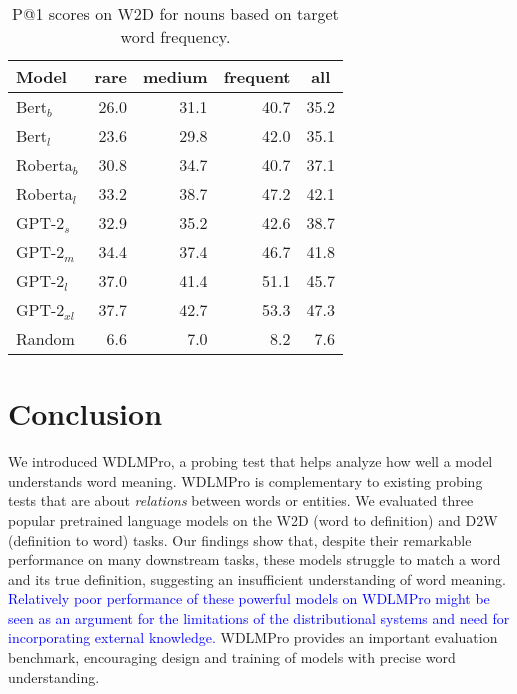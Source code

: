 \documentclass[11pt,a4paper]{article}
\begin{document}
\begin{table}
    \centering
    \begin{tabular}{l|rrrr}
    \hline
         \textbf{Model} & \multicolumn{1}{c}{\textbf{rare}} & \multicolumn{1}{c}{\textbf{medium}} & \multicolumn{1}{c}{\textbf{frequent}} & \multicolumn{1}{c}{\textbf{all}} \\ \hline
     Bert$_{b}$ & 26.0 & 31.1 & 40.7 & 35.2 \\
     Bert$_{l}$ & 23.6 & 29.8 & 42.0 & 35.1 \\
     Roberta$_{b}$ & 30.8 & 34.7 & 40.7 & 37.1 \\
     Roberta$_{l}$ & 33.2 & 38.7 & 47.2 & 42.1 \\ \hline
     GPT-2$_{s}$ & 32.9 & 35.2 & 42.6 & 38.7 \\
     GPT-2$_{m}$ & 34.4 & 37.4 & 46.7 & 41.8 \\
     GPT-2$_{l}$ & 37.0 & 41.4 & 51.1 & 45.7 \\
     GPT-2$_{xl}$ & 37.7 & 42.7 & 53.3 & 47.3 \\ \hline
     Random & 6.6 & 7.0 & 8.2 & 7.6 \\ \hline 
     
    \end{tabular}
    \caption{P@1 scores on W2D for nouns based on target word frequency.}
    \label{tab:freq_results_W2D}
\end{table}



\section{Conclusion}
We introduced
WDLMPro,
a
probing test that helps  analyze  how well a model
understands word meaning. WDLMPro is complementary to existing
probing tests that are about
\emph{relations} between words or entities.
We evaluated three popular pretrained language
models on the W2D (word to definition) and D2W (definition
to word) tasks. Our findings show
that, despite their remarkable performance on many
downstream tasks, these models struggle to match a word and
its true definition, suggesting an insufficient
understanding of word meaning.
\textcolor{blue}{Relatively poor performance of these powerful models on WDLMPro might be seen as an argument for the limitations of the distributional systems and need for incorporating external knowledge.} 
WDLMPro provides an important
evaluation benchmark, encouraging design and training of
models with precise word understanding.
\end{document}
